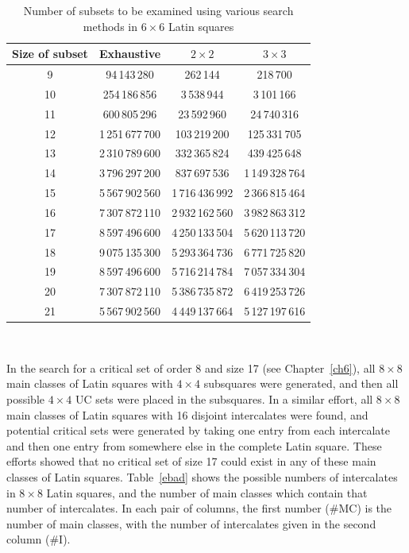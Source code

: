\documentclass[12pt]{report}
\begin{document}
\begin{table}
\caption{Number of subsets to be examined using various search methods in $6 \times 6$ Latin squares}
\label{split}
\begin{center}
\begin{tabular}{|c|c|c|c|}
\hline
Size of subset & Exhaustive & $2 \times 2$ & $3 \times 3$ \\
\hline
9  &    94\,143\,280 &       262\,144 &       218\,700 \\
10 &   254\,186\,856 &     3\,538\,944 &     3\,101\,166 \\
11 &   600\,805\,296 &    23\,592\,960 &    24\,740\,316 \\
12 & 1\,251\,677\,700 &   103\,219\,200 &   125\,331\,705 \\
13 & 2\,310\,789\,600 &   332\,365\,824 &   439\,425\,648 \\
14 & 3\,796\,297\,200 &   837\,697\,536 & 1\,149\,328\,764 \\
15 & 5\,567\,902\,560 & 1\,716\,436\,992 & 2\,366\,815\,464 \\
16 & 7\,307\,872\,110 & 2\,932\,162\,560 & 3\,982\,863\,312 \\
17 & 8\,597\,496\,600 & 4\,250\,133\,504 & 5\,620\,113\,720 \\
18 & 9\,075\,135\,300 & 5\,293\,364\,736 & 6\,771\,725\,820 \\
19 & 8\,597\,496\,600 & 5\,716\,214\,784 & 7\,057\,334\,304 \\
20 & 7\,307\,872\,110 & 5\,386\,735\,872 & 6\,419\,253\,726 \\
21 & 5\,567\,902\,560 & 4\,449\,137\,664 & 5\,127\,197\,616 \\
\hline
\end{tabular} \vspace{3mm} \\
\end{center}
\end{table}
\vspace{3mm}

In the search for a critical set of order 8 and size 17 (see
Chapter~\ref{ch6}), all $8 \times 8$ main classes
of Latin squares with $4 \times 4$ subsquares were generated, and then
all possible $4 \times 4$ UC sets were placed in the subsquares.  In a
similar effort, all $8 \times 8$ main classes of Latin squares with 16 disjoint
intercalates were found, and potential critical sets were generated
by taking one entry from each intercalate and then one entry 
from somewhere else in the complete Latin square.  These efforts showed
that no critical set of size 17 could exist in any of these main classes
of Latin squares.  Table~\ref{ebad} shows the possible numbers of 
intercalates in $8 \times 8$ Latin squares, and the number of main
classes which contain that number of intercalates.  In each pair
of columns, the first number (\#MC) is the number of main classes, with
the number of intercalates given in the second column (\#I).  
\end{document}
